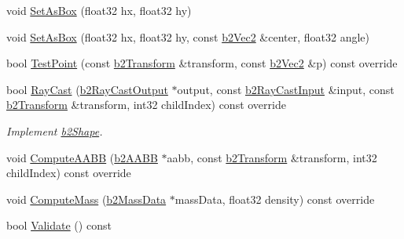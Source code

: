 \begin{DoxyCompactItemize}
void \hyperlink{classb2PolygonShape_a6bb90df8b4a40d1c53b64cc352a855dd}{Set\+As\+Box} (float32 hx, float32 hy)
\item 
void \hyperlink{classb2PolygonShape_a890690250115483da6c7d69829be087e}{Set\+As\+Box} (float32 hx, float32 hy, const \hyperlink{structb2Vec2}{b2\+Vec2} \&center, float32 angle)
\item 
bool \hyperlink{classb2PolygonShape_a129c4ac76727fe02724f675e3fef7fe5}{Test\+Point} (const \hyperlink{structb2Transform}{b2\+Transform} \&transform, const \hyperlink{structb2Vec2}{b2\+Vec2} \&p) const override
\item 
\mbox{\label{classb2PolygonShape_a41f20072763688f1745f12f67f40e904}} 
bool \hyperlink{classb2PolygonShape_a41f20072763688f1745f12f67f40e904}{Ray\+Cast} (\hyperlink{structb2RayCastOutput}{b2\+Ray\+Cast\+Output} $\ast$output, const \hyperlink{structb2RayCastInput}{b2\+Ray\+Cast\+Input} \&input, const \hyperlink{structb2Transform}{b2\+Transform} \&transform, int32 child\+Index) const override
\begin{DoxyCompactList}\small\item\em Implement \hyperlink{classb2Shape}{b2\+Shape}. \end{DoxyCompactList}\item 
void \hyperlink{classb2PolygonShape_ae9bcc185caf4a030003cefc4576e4717}{Compute\+A\+A\+BB} (\hyperlink{structb2AABB}{b2\+A\+A\+BB} $\ast$aabb, const \hyperlink{structb2Transform}{b2\+Transform} \&transform, int32 child\+Index) const override
\item 
void \hyperlink{classb2PolygonShape_a908db2a51fc79fd49d6fe06be2cd8474}{Compute\+Mass} (\hyperlink{structb2MassData}{b2\+Mass\+Data} $\ast$mass\+Data, float32 density) const override
\item 
bool \hyperlink{classb2PolygonShape_a135f4c20e17f10479e08f7befbd4d1f0}{Validate} () const
\end{DoxyCompactItemize}
